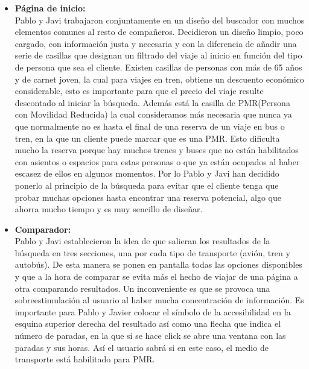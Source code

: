 \begin{itemize}
      \item\textbf{Página de inicio:} \\ Pablo y Javi trabajaron conjuntamente en un diseño del buscador con muchos elementos comunes al resto de compañeros. Decidieron un diseño limpio, poco cargado, con información justa y necesaria y con la diferencia de añadir una serie de casillas que designan un filtrado del viaje al inicio en función del tipo de persona que sea el cliente. Existen casillas de personas con más de 65 años y de carnet joven, la cual para viajes en tren, obtiene un descuento económico considerable, esto es importante para que el precio del viaje resulte descontado al iniciar la búsqueda. Además está la casilla de PMR(Persona con Movilidad Reducida) la cual consideramos más necesaria que nunca ya que normalmente no es hasta el final de una reserva de un viaje en bus o tren, en la que un cliente puede marcar que es una PMR. Esto dificulta mucho la reserva porque hay muchos trenes y buses que no están habilitados con asientos o espacios para estas personas o que ya están ocupados al haber escasez de ellos en algunos momentos. Por lo Pablo y Javi han decidido ponerlo al principio de la búsqueda para evitar que el cliente tenga que probar muchas opciones hasta encontrar una reserva potencial, algo que ahorra mucho tiempo y es muy sencillo de diseñar.

      \item\textbf{Comparador:} \\ Pablo y Javi establecieron la idea de que salieran los resultados de la búsqueda en tres secciones, una por cada tipo de transporte (avión, tren y autobús). De esta manera se ponen en pantalla todas las opciones disponibles y que a la hora de comparar se evita más el hecho de viajar de una página a otra comparando resultados. Un inconveniente es que se provoca una sobreestimulación al usuario al haber mucha concentración de información.
            Es importante para Pablo y Javier colocar el símbolo de la accesibilidad en la esquina superior derecha del resultado así como una flecha que indica el número de paradas, en la que si se hace click se abre una ventana con las paradas y sus horas. Así el usuario sabrá si en este caso, el medio de transporte está habilitado para PMR.


\end{itemize}
